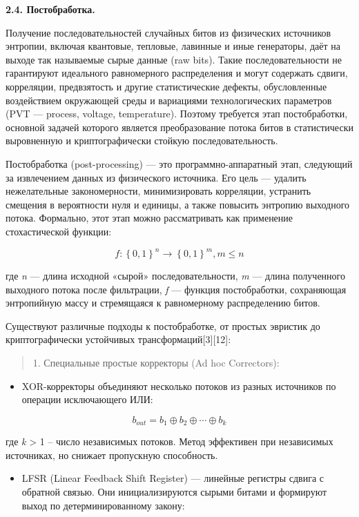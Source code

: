 \textbf{2.4. Постобработка.}

Получение последовательностей случайных битов из физических источников
энтропии, включая квантовые, тепловые, лавинные и иные генераторы, даёт
на выходе так называемые сырые данные (raw bits). Такие
последовательности не гарантируют идеального равномерного распределения
и могут содержать сдвиги, корреляции, предвзятость и другие
статистические дефекты, обусловленные воздействием окружающей среды и
вариациями технологических параметров (PVT --- process, voltage,
temperature). Поэтому требуется этап постобработки, основной задачей
которого является преобразование потока битов в статистически
выровненную и криптографически стойкую последовательность.

Постобработка (post-processing) --- это программно-аппаратный этап,
следующий за извлечением данных из физического источника. Его цель ---
удалить нежелательные закономерности, минимизировать корреляции,
устранить смещения в вероятности нуля и единицы, а также повысить
энтропию выходного потока. Формально, этот этап можно рассматривать как
применение стохастической функции:

\[f:\left\{ 0,1 \right\}^{n} \rightarrow \left\{ 0,1 \right\}^{m},m \leq n\]

где \emph{n} --- длина исходной «сырой» последовательности, \emph{m} ---
длина полученного выходного потока после фильтрации, \emph{f} ---
функция постобработки, сохраняющая энтропийную массу и стремящаяся к
равномерному распределению битов.

Существуют различные подходы к постобработке, от простых эвристик до
криптографически устойчивых трансформаций{[}3{]}{[}12{]}:

\begin{quote}
1. Специальные простые корректоры (Ad hoc Correctors):
\end{quote}

\begin{itemize}
\item
  XOR-корректоры объединяют несколько потоков из разных источников по
  операции исключающего ИЛИ:
\end{itemize}

\[b_{out} = b_{1} \oplus b_{2} \oplus \cdots \oplus b_{k}\]

где \emph{k} \textgreater{} 1 -- число независимых потоков. Метод
эффективен при независимых источниках, но снижает пропускную
способность.

\begin{itemize}
\item
  LFSR (Linear Feedback Shift Register) --- линейные регистры сдвига с
  обратной связью. Они инициализируются сырыми битами и формируют выход
  по детерминированному закону:
\end{itemize}

